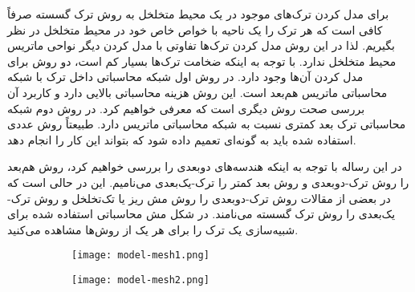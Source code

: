برای مدل کردن ترک‌های موجود در یک محیط متخلخل به روش ترک گسسته صرفاً کافی است که هر ترک را یک ناحیه با خواص خاص خود در محیط متخلخل در نظر بگیریم. لذا در این روش مدل کردن ترک‌ها تفاوتی با مدل کردن دیگر نواحی ماتریس محیط متخلخل ندارد. با توجه به اینکه ضخامت ترک‌ها بسیار کم است، دو روش برای مدل کردن آن‌ها وجود دارد. در روش اول شبکه محاسباتی داخل ترک با شبکه محاسباتی ماتریس هم‌بعد است. این روش هزینه محاسباتی بالایی دارد و کاربرد آن بررسی صحت روش دیگری است که معرفی خواهیم کرد. در روش دوم شبکه محاسباتی ترک بعد کمتری نسبت به شبکه محاسباتی ماتریس دارد. طبیعتاً روش عددی استفاده شده باید به گونه‌ای تعمیم داده شود که بتواند این کار را انجام دهد.

در این رساله با توجه به اینکه هند‌سه‌های دوبعدی را بررسی خواهیم کرد، روش هم‌بعد را روش ترک-دوبعدی و روش بعد کمتر را ترک-یک‌بعدی می‌نامیم. این در حالی است که در بعضی از مقالات روش ترک-دوبعدی را روش مش ریز یا تک‌تخلخل و روش ترک-یک‌بعدی را روش ترک گسسته می‌نامند. در شکل  مش محاسباتی استفاده شده برای شبیه‌سازی یک ترک را برای هر یک از روش‌ها مشاهده می‌کنید.
\begin{figure}
\begin{subfigure}{0.5\textwidth}
\texttt{[image: model-mesh1.png]} 
\label{fig:2f-1}
\end{subfigure}
\begin{subfigure}{0.5\textwidth}
\texttt{[image: model-mesh2.png]} 
\label{fig:2f-2}
\end{subfigure}

\label{fig:2f}
\end{figure}
